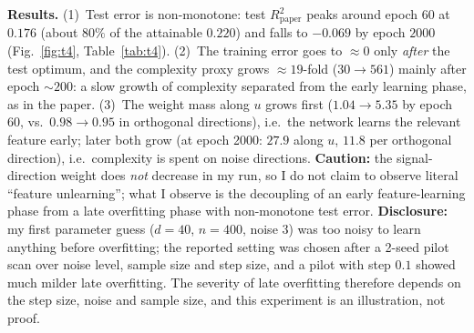 \documentclass[11pt,a4paper]{article}
\newcommand{\Rpaper}{R^2_{\mathrm{paper}}}
\begin{document}
\textbf{Results.} (1)~Test error is non-monotone: test $\Rpaper$ peaks around epoch $60$ at $0.176$ (about $80\%$ of the attainable $0.220$) and falls to $-0.069$ by epoch $2000$ (Fig.~\ref{fig:t4}, Table~\ref{tab:t4}).
(2)~The training error goes to $\approx0$ only \emph{after} the test optimum, and the complexity proxy grows $\approx19$-fold ($30\to561$) mainly after epoch $\sim200$: a slow growth of complexity separated from the early learning phase, as in the paper.
(3)~The weight mass along $u$ grows first ($1.04\to5.35$ by epoch 60, vs.\ $0.98\to0.95$ in orthogonal directions), i.e.\ the network learns the relevant feature early; later both grow (at epoch 2000: $27.9$ along $u$, $11.8$ per orthogonal direction), i.e.\ complexity is spent on noise directions.
\textbf{Caution:} the signal-direction weight does \emph{not} decrease in my run, so I do not claim to observe literal ``feature unlearning''; what I observe is the decoupling of an early feature-learning phase from a late overfitting phase with non-monotone test error.
\textbf{Disclosure:} my first parameter guess ($d=40$, $n=400$, noise $3$) was too noisy to learn anything before overfitting; the reported setting was chosen after a 2-seed pilot scan over noise level, sample size and step size, and a pilot with step $0.1$ showed much milder late overfitting.
The severity of late overfitting therefore depends on the step size, noise and sample size, and this experiment is an illustration, not proof.
\end{document}
